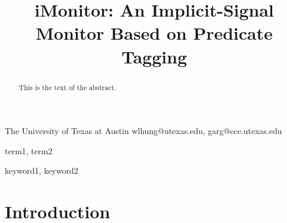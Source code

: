 \documentclass[preprint]{sigplanconf}
\begin{document}
\copyrightdata{[to be supplied]} 


\title{iMonitor: An Implicit-Signal Monitor Based on Predicate Tagging}
\subtitle{}

           {The University of Texas at Austin}
           {wlhung@utexas.edu, garg@ece.utexas.edu}

\maketitle

\begin{abstract}
This is the text of the abstract.
\end{abstract}


\terms
term1, term2

\keywords
keyword1, keyword2








\section{Introduction} \label{sec:intro}
\end{document}
